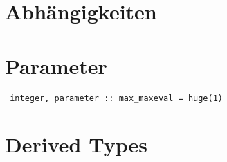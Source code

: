 \section{Abhängigkeiten}
\section{Parameter}
\begin{Verbatim}
 integer, parameter :: max_maxeval = huge(1)
\end{Verbatim}
\section{Derived Types}
